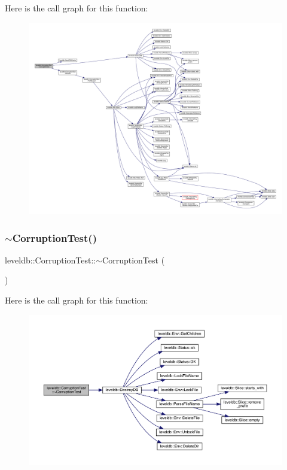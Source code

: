 Here is the call graph for this function\+:
\nopagebreak
\begin{figure}[H]
\begin{center}
\leavevmode
\includegraphics[width=350pt]{classleveldb_1_1_corruption_test_a9940767db260b1e4e60b8bcedc50217c_cgraph}
\end{center}
\end{figure}
\mbox{\label{classleveldb_1_1_corruption_test_a4086f02f771d78d4ce242c14b0e392d9}} 
\subsubsection{\texorpdfstring{$\sim$CorruptionTest()}{~CorruptionTest()}}
{\footnotesize\ttfamily leveldb\+::\+Corruption\+Test\+::$\sim$\+Corruption\+Test (\begin{DoxyParamCaption}{ }\end{DoxyParamCaption})\hspace{0.3cm}{\ttfamily [inline]}}

Here is the call graph for this function\+:
\nopagebreak
\begin{figure}[H]
\begin{center}
\leavevmode
\includegraphics[width=350pt]{classleveldb_1_1_corruption_test_a4086f02f771d78d4ce242c14b0e392d9_cgraph}
\end{center}
\end{figure}


